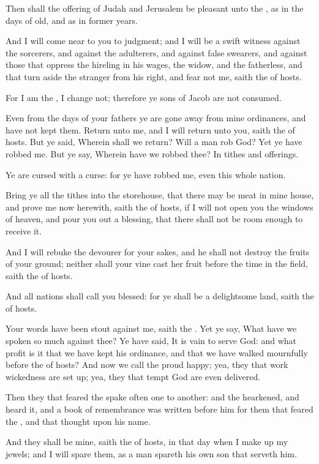 \verse Then shall the offering of Judah and Jerusalem be pleasant unto the \LORD, as in the days of old, and as in former years.

\verse And I will come near to you to judgment; and I will be a swift witness against the sorcerers, and against the adulterers, and against false swearers, and against those that oppress the hireling in his wages, the widow, and the fatherless, and that turn aside the stranger from his right, and fear not me, saith the \LORD of hosts.

\verse For I am the \LORD, I change not; therefore ye sons of Jacob are not consumed.

\verse Even from the days of your fathers ye are gone away from mine ordinances, and have not kept them. Return unto me, and I will return unto you, saith the \LORD of hosts. But ye said, Wherein shall we return?  \verse Will a man rob God? Yet ye have robbed me. But ye say, Wherein have we robbed thee? In tithes and offerings.

\verse Ye are cursed with a curse: for ye have robbed me, even this whole nation.

\verse Bring ye all the tithes into the storehouse, that there may be meat in mine house, and prove me now herewith, saith the \LORD of hosts, if I will not open you the windows of heaven, and pour you out a blessing, that there shall not be room enough to receive it.

\verse And I will rebuke the devourer for your sakes, and he shall not destroy the fruits of your ground; neither shall your vine cast her fruit before the time in the field, saith the \LORD of hosts.

\verse And all nations shall call you blessed: for ye shall be a delightsome land, saith the \LORD of hosts.

\verse Your words have been stout against me, saith the \LORD. Yet ye say, What have we spoken so much against thee?  \verse Ye have said, It is vain to serve God: and what profit is it that we have kept his ordinance, and that we have walked mournfully before the \LORD of hosts?  \verse And now we call the proud happy; yea, they that work wickedness are set up; yea, they that tempt God are even delivered.

\verse Then they that feared the \LORD spake often one to another: and the \LORD hearkened, and heard it, and a book of remembrance was written before him for them that feared the \LORD, and that thought upon his name.

\verse And they shall be mine, saith the \LORD of hosts, in that day when I make up my jewels; and I will spare them, as a man spareth his own son that serveth him.

